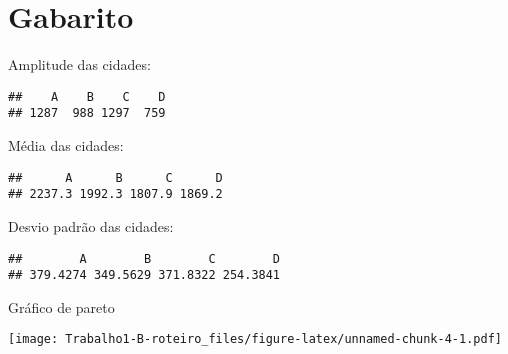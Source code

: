 \documentclass[]{article}
\begin{document}
\section{Gabarito}\label{gabarito}

Amplitude das cidades:

\begin{verbatim}
##    A    B    C    D 
## 1287  988 1297  759
\end{verbatim}

Média das cidades:

\begin{verbatim}
##      A      B      C      D 
## 2237.3 1992.3 1807.9 1869.2
\end{verbatim}

Desvio padrão das cidades:

\begin{verbatim}
##        A        B        C        D 
## 379.4274 349.5629 371.8322 254.3841
\end{verbatim}

Gráfico de pareto

\texttt{[image: Trabalho1-B-roteiro\_files/figure-latex/unnamed-chunk-4-1.pdf]}\\
\end{document}
